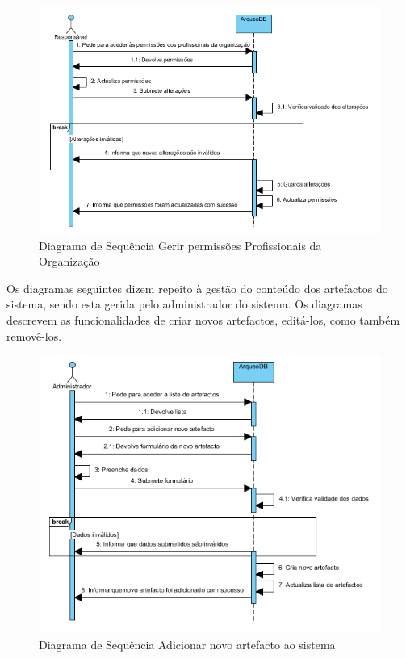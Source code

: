 \documentclass[12pt,a4paper]{article}
\begin{document}
\begin{figure}[h!]
\centering
\includegraphics[scale=1]{sequencia/P_permissoes}
\caption{Diagrama de Sequência Gerir permissões Profissionais da Organização} 
\end{figure}  

\clearpage
Os diagramas seguintes dizem repeito à gestão do conteúdo dos artefactos do sistema, sendo esta gerida pelo administrador do sistema. Os diagramas descrevem as funcionalidades de criar novos artefactos, editá-los, como também  removê-los.\\

\begin{figure}[h!]
\centering
\includegraphics[scale=1]{sequencia/A_criarartefacto}
\caption{Diagrama de Sequência Adicionar novo artefacto ao sistema} 
\end{figure}  
\end{document}
